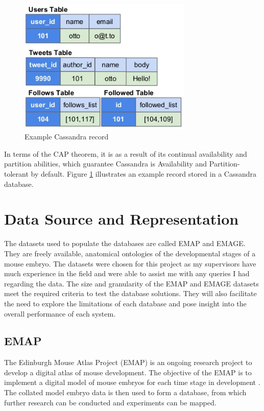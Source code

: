 \begin{figure}[H]\begin{center}\includegraphics[height=6.5cm,width=0.6\linewidth]{images/cassandramodel}\caption{Example Cassandra record}\label{fig:cass}\end{center}\end{figure} In terms of the CAP theorem, it is as a result of its continual availability and partition abilities, which guarantee Cassandra is Availability and Partition-tolerant by default. Figure \ref{fig:cass} illustrates an example record stored in a Cassandra database.

\section{Data Source and Representation}\label{datasource}
The datasets used to populate the databases are called EMAP and EMAGE. They are freely available, anatomical ontologies of the developmental stages of a mouse embryo. The datasets were chosen for this project as my supervisors have much experience in the field and were able to assist me with any queries I had regarding the data. The size and granularity of the EMAP and EMAGE datasets meet the required criteria to test the database solutions. They will also facilitate the need to explore the limitations of each database and pose insight into the overall performance of each system.

\subsection{EMAP}
The Edinburgh Mouse Atlas Project (EMAP) is an ongoing research project to develop a digital atlas of mouse development. The objective of the EMAP is to implement a digital model of mouse embryos for each time stage in development \cite{emap}. The collated model embryo data is then used to form a database, from which further research can be conducted and experiments can be mapped.
 
